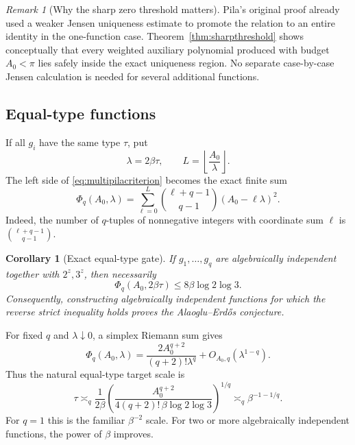 \documentclass[11pt,oneside]{article}
\newtheorem{corollary}[theorem]{Corollary}
\theoremstyle{definition}
\theoremstyle{remark}
\newtheorem{remark}[theorem]{Remark}
\begin{document}
\begin{remark}[Why the sharp zero threshold matters]
Pila's original proof already used a weaker Jensen uniqueness estimate to promote the
relation to an entire identity in the one-function case.  Theorem~\ref{thm:sharpthreshold}
shows conceptually that every weighted auxiliary polynomial produced with budget
$A_0<\pi$ lies safely inside the exact uniqueness region.  No separate case-by-case Jensen
calculation is needed for several additional functions.
\end{remark}

\subsection{Equal-type functions}

If all $g_i$ have the same type $\tau$, put
\[
 \lambda=2\beta\tau,
 \qquad
 L=\left\lfloor\frac{A_0}{\lambda}\right\rfloor.
\]
The left side of \eqref{eq:multipilacriterion} becomes the exact finite sum
\begin{equation}
 \Phi_q(A_0,\lambda)
 =\sum_{\ell=0}^{L}
   \binom{\ell+q-1}{q-1}(A_0-\ell\lambda)^2.
 \label{eq:Phiq}
\end{equation}
Indeed, the number of $q$-tuples of nonnegative integers with coordinate sum $\ell$ is
$\binom{\ell+q-1}{q-1}$.

\begin{corollary}[Exact equal-type gate]
\label{cor:equaltypegate}
If $g_1,\dots,g_q$ are algebraically independent together with $2^z,3^z$, then necessarily
\begin{equation}
 \Phi_q(A_0,2\beta\tau)
 \le8\beta\log2\log3.
 \label{eq:equaltypenecessary}
\end{equation}
Consequently, constructing algebraically independent functions for which the reverse strict
inequality holds proves the Alaoglu--Erd\H{o}s conjecture.
\end{corollary}

For fixed $q$ and $\lambda\downarrow0$, a simplex Riemann sum gives
\begin{equation}
 \Phi_q(A_0,\lambda)
 =\frac{2A_0^{q+2}}{(q+2)!\lambda^q}
  +O_{A_0,q}(\lambda^{1-q}).
 \label{eq:Phiqasymp}
\end{equation}
Thus the natural equal-type target scale is
\begin{equation}
 \tau
 \asymp_q
 \frac1{2\beta}
 \left(
  \frac{A_0^{q+2}}
       {4(q+2)!\,\beta\log2\log3}
 \right)^{1/q}
 \asymp_q\beta^{-1-1/q}.
 \label{eq:qscale}
\end{equation}
For $q=1$ this is the familiar $\beta^{-2}$ scale.  For two or more algebraically
independent functions, the power of $\beta$ improves.
\end{document}
